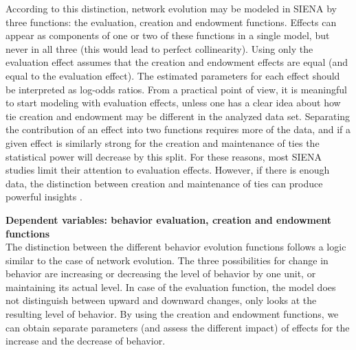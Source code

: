 \documentclass[a4paper,fleqn,11pt]{article}
\newcommand{\+}{\, + \,}
\newcommand{\SI}{{\sf SIENA }}
\begin{document}
According to this distinction, network evolution may be modeled
in \SI by three functions: the evaluation, creation and endowment functions.
Effects can appear as components of one or two of these functions in a single model,
but never in all three (this would lead to perfect collinearity).
Using only the evaluation effect assumes that the creation and endowment
effects are equal (and equal to the evaluation effect). The estimated
parameters for each effect should be interpreted as log-odds ratios.
From a practical point of view, it is meaningful to start modeling with
evaluation effects, unless one has a clear idea about how tie creation
and endowment may be different in the analyzed data set.
Separating the contribution of an effect into two functions requires
more of the data, and if a given effect is similarly strong for the
creation and maintenance of ties the statistical power will
decrease by this split.
 For these reasons, most  \SI studies limit their
 attention to evaluation effects. However, if there is enough data,
 the distinction between creation and maintenance of ties can
 produce powerful insights \citep[e.g.,][]{Cheadle_etal2013}.\\
\newpage

\noindent
\textbf{Dependent variables: behavior evaluation, creation and endowment functions}\\

The distinction between the different behavior evolution functions follows
a logic similar to the case of network evolution. The three possibilities
for change in behavior are increasing or decreasing the level of behavior
by one unit, or maintaining its actual level. In case of the evaluation
function, the model does not distinguish between upward and downward changes,
only looks at the resulting level of behavior. By using the creation and
endowment functions, we can obtain separate parameters (and assess the
different impact) of effects for the increase and the decrease of behavior.
\end{document}
